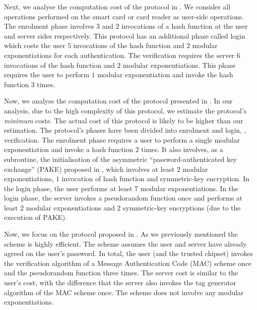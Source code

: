 Next, we analyse the computation cost of the protocol in \cite{WangW18}. We consider all operations performed on the smart card or card reader as user-side operations. The enrolment phase involves $3$ and $2$ invocations of a hash function at the user and server sides respectively. This protocol has an additional phase called login which costs the user  $5$ invocations of the hash function and $2$ modular exponentiations for each authentication.  The verification requires the server $6$ invocations of the hash function and $2$ modular exponentiations. This phase requires the user to perform $1$ modular exponentiation and invoke the hash function $3$ times. 


Now, we analyse the computation cost of the protocol presented in \cite{JareckiJKSS21}. In our analysis, due to the high complexity of this protocol, we estimate the protocol's \emph{minimum} costs. The actual cost of this protocol is likely to be higher than our estimation. The protocol's phases have been divided into enrolment and login, \ie, verification. The enrolment phase requires a user to perform a single modular exponentiation and invoke a hash function $2$ times. It also involves, as a subroutine, the initialisation of the asymmetric  ``password-authenticated key exchange'' (PAKE) proposed in \cite{GentryMR06}, which involves at least $2$ modular exponentiations, $1$ invocation of hash function and symmetric-key encryption. In the login phase, the user performs at least $7$ modular exponentiations. In the login phase, the server invokes a pseudorandom function once and performs at least $2$ modular exponentiations and $2$ symmetric-key encryptions (due to the execution of PAKE). 

Now, we focus on the protocol proposed in \cite{MatsuoMY11}. As we previously mentioned the scheme is highly efficient. The scheme assumes the user and server have already agreed on the user's password. 
%
In total, the user (and the trusted chipset) invokes the verification algorithm of a Message Authentication Code (MAC) scheme once and the pseudorandom function three times. The server cost is similar to the user's cost, with the difference that the server also invokes the tag generator algorithm of the MAC scheme once. The scheme does not involve any modular exponentiations. 

